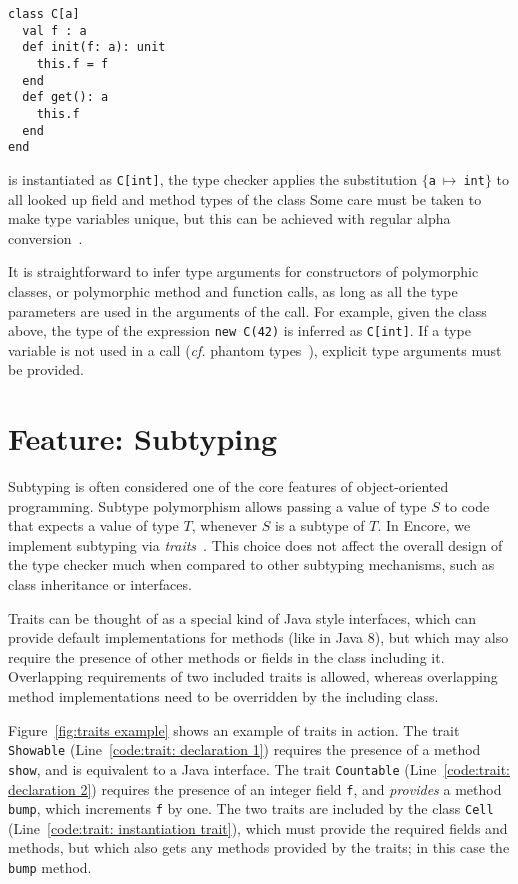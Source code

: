 \documentclass[sigplan,screen]{acmart}
\makeatletter
\newcommand{\ec}[1]{\lstinline[style=encore,breaklines=true,basicstyle=\fontsize{9}{9}\tt]@#1@}
\makeatother
\begin{document}
\begin{minipage}[t]{\linewidth}
\begin{lstlisting}[style=encore,xleftmargin=8ex]
class C[a]
  val f : a
  def init(f: a): unit
    this.f = f
  end
  def get(): a
    this.f
  end
end
\end{lstlisting}
\end{minipage}

\noindent
is instantiated as \ec{C[int]}, the type checker applies the
substitution $\{$\ec{a}$~\mapsto~$\ec{int}$\}$ to all looked up
field and method types of the class
%
Some care must be taken to make type variables unique, but this
can be achieved with regular alpha conversion~\cite{TAPL}.

It is straightforward to infer type arguments for constructors of
polymorphic classes, or polymorphic method and function calls, as
long as all the type parameters are used in the arguments of the
call.
%
For example, given the class above, the type of the expression
\ec{new C(42)} is inferred as \ec{C[int]}. If a type variable is
not used in a call (\emph{cf.} phantom
types~\cite{phantom-types}), explicit type arguments must be
provided.

\section{Feature: Subtyping}
\label{sec: traits}

Subtyping is often considered one of the core features of
object-oriented programming. Subtype polymorphism allows passing a
value of type $S$ to code that expects a value of type $T$,
whenever $S$ is a subtype of $T$. In Encore, we implement
subtyping via \emph{traits}~\cite{traits}. This choice does not
affect the overall design of the type checker much when compared
to other subtyping mechanisms, such as class inheritance or
interfaces.

Traits can be thought of as a special kind of Java style
interfaces, which can provide default implementations for methods
(like in Java 8), but which may also require the presence of other methods
or fields in the class including it. Overlapping requirements of
two included traits is allowed, whereas overlapping method
implementations need to be overridden by the including class.

Figure~\ref{fig:traits example} shows an example of traits in
action. The trait \ec{Showable} (Line~\ref{code:trait: declaration
  1}) requires the presence of a method \ec{show}, and is
equivalent to a Java interface. The trait \ec{Countable}
(Line~\ref{code:trait: declaration 2}) requires the presence of an
integer field \ec{f}, and \emph{provides} a method \ec{bump},
which increments \ec{f} by one. The two traits are included by the
class \ec{Cell} (Line~\ref{code:trait: instantiation trait}),
which must provide the required fields and methods, but which also
gets any methods provided by the traits; in this case the
\ec{bump} method.
\end{document}
